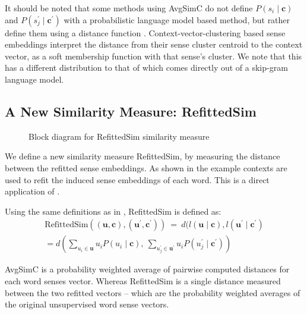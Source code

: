 \documentclass{article} %
\def\parencite{\cite} %
\renewcommand{\c}{\mathbf{c}}
\renewcommand{\u}{\mathbf{u}}
\providecommand{\DIFaddbegin}{} %
\providecommand{\DIFaddend}{} %
\providecommand{\DIFdelbegin}{} %
\providecommand{\DIFdelend}{} %
\begin{document}
It should be noted that some methods using AvgSimC  do not define  $P(s_{i}\mid\c)$ and $P(s_{j}^{\prime}\mid\c^\prime)$ with a probabilistic language model based method, but rather define them using a distance function \DIFdelbegin %
\DIFdelend \DIFaddbegin \parencite{Huang2012,Reisinger2010}\DIFaddend . Context-vector-clustering based sense embeddings interpret the distance from their sense cluster centroid to the context vector, as a soft membership function with that sense's cluster. We note that this has a different distribution to that of which comes directly out of a skip-gram language model.



\subsection{A New Similarity Measure: RefittedSim}\label{RefittedSimVsAvgSimC}
\begin{figure}
	\begin{adjustbox}{max width=\columnwidth}
	
	\end{adjustbox}
	\caption{Block diagram for RefittedSim similarity measure} \label{diaRefittedSim}
\end{figure}
We define a new similarity measure RefittedSim, by measuring the distance between the refitted sense embeddings.
As shown in  the example contexts are used to refit the induced sense embeddings of each word.
This is a direct application of  . 

Using the same definitions as in , RefittedSim is defined as:
\begin{multline} \label{eq:refittedsim}
\mathrm{RefittedSim}((\u,\c),(\u^{\prime},\c^{\prime}))
\DIFdelbegin %
\DIFdelend \DIFaddbegin \:\DIFaddend =\DIFaddbegin \: \DIFaddend d(l(\u \mid \c), l(\u^\prime \mid \c^\prime)\\
\DIFdelbegin %
\DIFdelend = d\left(
\sum_{u_{i}\in\u}u_{i}P(u_{i}\mid\c),\:
\sum_{u_{j}^{\prime}\in\u^{\prime}}u_{i}P(u_{j}^{\prime}\mid\c^{\prime})\right)
\DIFdelbegin %
\DIFdelend \end{multline}

AvgSimC is a probability weighted average of pairwise computed distances for each word senses vector.
Whereas RefittedSim is a single distance measured between the two refitted vectors -- which are the probability weighted averages of the original unsupervised word sense vectors.
\end{document}
